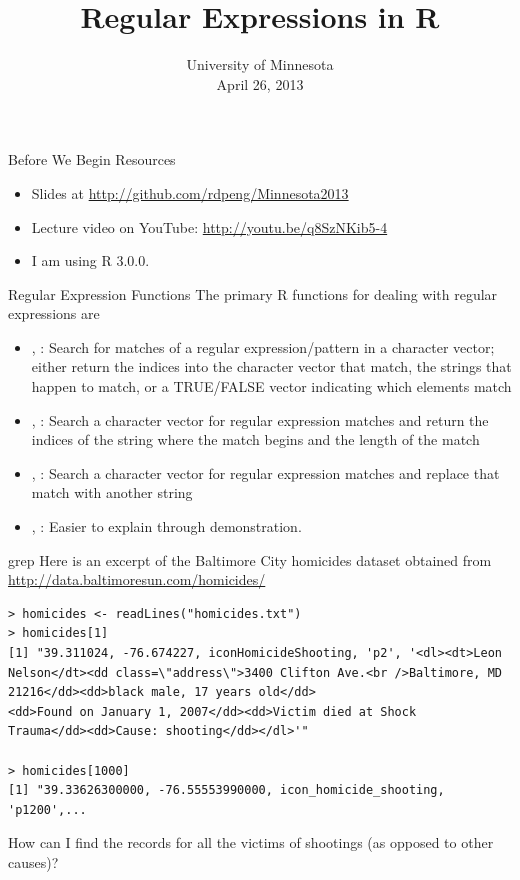 \documentclass[aspectratio=169]{beamer}
\title[Regular Expressions in R]{Regular Expressions in R}
\date{University of Minnesota\\April 26, 2013}
\begin{document}
\begin{frame}
  \titlepage
\end{frame}

\begin{frame}{Before We Begin}
Resources
\begin{itemize}
\item Slides at \url{http://github.com/rdpeng/Minnesota2013}
\item Lecture video on YouTube: \url{http://youtu.be/q8SzNKib5-4}
\item I am using R 3.0.0.
\end{itemize}
\end{frame}


\begin{frame}{Regular Expression Functions}
The primary R functions for dealing with regular expressions are
\begin{itemize}
\item {}, : Search for matches of a regular
  expression/pattern in a character vector; either return the indices
  into the character vector that match, the strings that happen to
  match, or a TRUE/FALSE vector indicating which elements match
\item {}, : Search a character vector for regular
  expression matches and return the indices of the string where the
  match begins and the length of the match
\item {}, : Search a character vector for regular
  expression matches and replace that match with another string
\item {}, : Easier to explain through demonstration.
\end{itemize}
\end{frame}

\begin{frame}[fragile]{grep}
Here is an excerpt of the Baltimore City homicides dataset obtained from \url{http://data.baltimoresun.com/homicides/}
\begin{verbatim}
> homicides <- readLines("homicides.txt")
> homicides[1]
[1] "39.311024, -76.674227, iconHomicideShooting, 'p2', '<dl><dt>Leon 
Nelson</dt><dd class=\"address\">3400 Clifton Ave.<br />Baltimore, MD 
21216</dd><dd>black male, 17 years old</dd>
<dd>Found on January 1, 2007</dd><dd>Victim died at Shock 
Trauma</dd><dd>Cause: shooting</dd></dl>'"

> homicides[1000]
[1] "39.33626300000, -76.55553990000, icon_homicide_shooting, 'p1200',...
\end{verbatim}
How can I find the records for all the victims of shootings (as
opposed to other causes)?
\end{frame}
\end{document}
